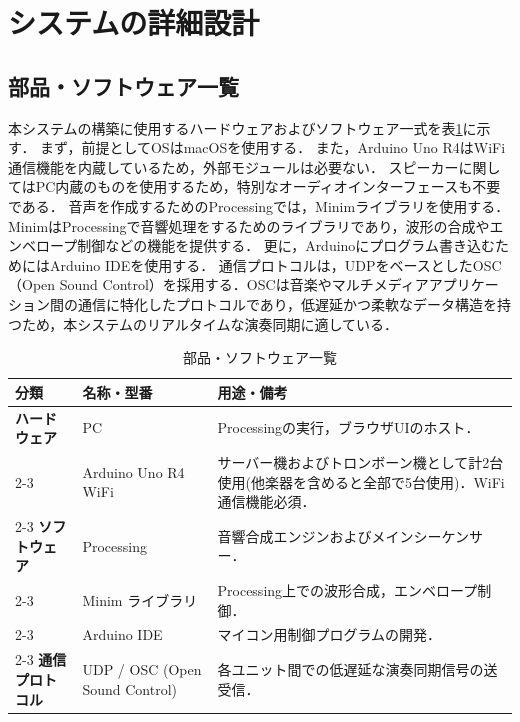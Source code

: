 \documentclass[uplatex,dvipdfmx]{jsarticle}
\begin{document}
\section{\textbf{システムの詳細設計}}

\subsection{\textbf{部品・ソフトウェア一覧}}
本システムの構築に使用するハードウェアおよびソフトウェア一式を表\ref{tab:parts}に示す．
\indent
まず，前提としてOSはmacOSを使用する．
また，Arduino Uno R4はWiFi通信機能を内蔵しているため，外部モジュールは必要ない．
スピーカーに関してはPC内蔵のものを使用するため，特別なオーディオインターフェースも不要である．
音声を作成するためのProcessingでは，Minimライブラリを使用する．
MinimはProcessingで⾳響処理をするためのライブラリであり，波形の合成やエンベロープ制御などの機能を提供する\cite{Minim}．
更に，Arduinoにプログラム書き込むためにはArduino IDEを使用する．
通信プロトコルは，UDPをベースとしたOSC（Open Sound Control）を採用する．OSCは音楽やマルチメディアアプリケーション間の通信に特化したプロトコルであり，低遅延かつ柔軟なデータ構造を持つため，本システムのリアルタイムな演奏同期に適している\cite{OSC}．

\begin{table}[H]
\centering
\renewcommand{\arraystretch}{1.2}
\small
\begin{tabularx}{\textwidth}{|l|>{\raggedright\arraybackslash}X|>{\raggedright\arraybackslash}X|}
\hline
 \textbf{分類} & \textbf{名称・型番} & \textbf{用途・備考} \\ \hline
 \textbf{ハードウェア} & PC & Processingの実行，ブラウザUIのホスト． \\ \cline{2-3}
  & Arduino Uno R4 WiFi & サーバー機およびトロンボーン機として計2台使用(他楽器を含めると全部で5台使用)．WiFi通信機能必須． \\ \cline{2-3}
 \textbf{ソフトウェア} & Processing & 音響合成エンジンおよびメインシーケンサー． \\ \cline{2-3}
  & Minim ライブラリ & Processing上での波形合成，エンベロープ制御． \\ \cline{2-3}
  & Arduino IDE & マイコン用制御プログラムの開発． \\ \cline{2-3}
 \textbf{通信プロトコル} & UDP / OSC (Open Sound Control) & 各ユニット間での低遅延な演奏同期信号の送受信． \\ \hline
\end{tabularx}
\caption{部品・ソフトウェア一覧}
\label{tab:parts}
\end{table}
\end{document}
